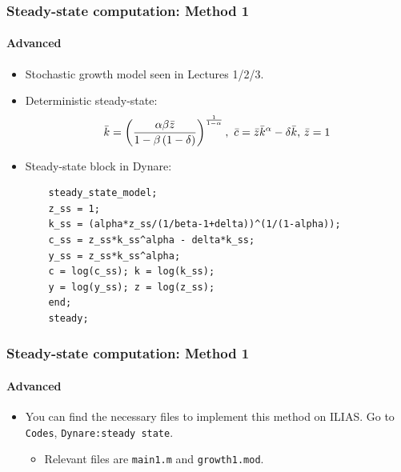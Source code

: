 \documentclass{beamer}
\begin{document}
\begin{frame}[fragile]
\frametitle{Steady-state computation: Method 1}
\framesubtitle{Advanced}
\small 
\begin{itemize}
	\item Stochastic growth model seen in Lectures 1/2/3.
	
	\item Deterministic steady-state:%
	\begin{equation*}
	\bar{k}=\left( \frac{\alpha \beta \bar{z}}{1-\beta \left( 1-\delta \right) }\right) ^{%
		\frac{1}{1-\alpha }},\ \bar{c}=\bar{z}\bar{k}^{\alpha }-\delta \bar{k}\text{, }\bar{z}=1
	\end{equation*}
	\item Steady-state block in Dynare:
	\begin{verbatim}
	steady_state_model;
	z_ss = 1;
	k_ss = (alpha*z_ss/(1/beta-1+delta))^(1/(1-alpha));
	c_ss = z_ss*k_ss^alpha - delta*k_ss;
	y_ss = z_ss*k_ss^alpha;
	c = log(c_ss); k = log(k_ss);
	y = log(y_ss); z = log(z_ss);
	end;
	steady;
	\end{verbatim}
	
\end{itemize}
\end{frame}

\begin{frame}[fragile]
\frametitle{Steady-state computation: Method 1}
\framesubtitle{Advanced}
\small 
\begin{itemize}
	\item You can find the necessary files to implement this method on ILIAS. Go to \texttt{Codes}, \texttt{Dynare:steady state}.
	\begin{itemize}
		\item Relevant files are \texttt{main1.m} and \texttt{growth1.mod}.
	\end{itemize}
\end{itemize}
\end{frame}
\end{document}
